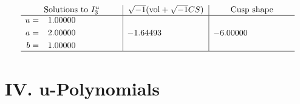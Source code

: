 \documentclass[1p]{elsarticle_modified}
\theoremstyle{definition}
\newcommand{\I}{\sqrt{-1}}
\begin{document}
$$\begin{array}{c|c|c}  
\text{Solutions to }I^u_{3}& \I (\text{vol} + \sqrt{-1}CS) & \text{Cusp shape}\\
 \hline 
\begin{aligned}
u &= \phantom{-}1.00000\phantom{ +0.000000I} \\
a &= \phantom{-}2.00000\phantom{ +0.000000I} \\
b &= \phantom{-}1.00000\phantom{ +0.000000I}\end{aligned}
 & -1.64493\phantom{ +0.000000I} & -6.00000\phantom{ +0.000000I}\\
 \hline 
 \end{array}$$\newpage
\newpage\renewcommand{\arraystretch}{1}
\centering \section*{ IV. u-Polynomials}
\end{document}
